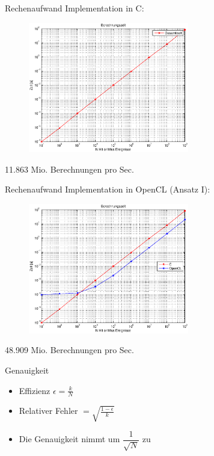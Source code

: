 \documentclass{beamer}
\begin{document}
\begin{frame}{Rechenaufwand}
	Implementation in C:
	\begin{figure}
		\centering
		\includegraphics[width=7cm]{images/Berechnungszeit_C.eps}
	\end{figure}
	11.863 Mio. Berechnungen pro Sec.
\end{frame}
\begin{frame}{Rechenaufwand}
	Implementation in OpenCL (Ansatz I):
	\begin{figure}
		\centering
		\includegraphics[width=7cm]{images/Berechnungszeit_OpenCL.eps} 
	\end{figure}
	48.909 Mio. Berechnungen pro Sec.
\end{frame}

\begin{frame}{Genauigkeit}
	\begin{itemize}
		\item<1-> Effizienz $\epsilon = \frac{k}{N}$
		\item<1->Relativer Fehler $= \sqrt{\frac{1-\epsilon}{k}}$
		\item<1-> Die Genauigkeit nimmt um $\dfrac{1}{\sqrt{N}}$ zu
	\end{itemize}
\end{frame}
\end{document}
